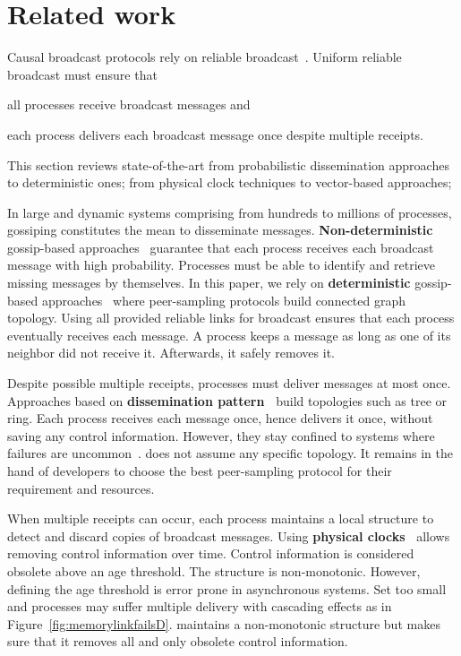 
\section{Related work}
\label{sec:relatedwork}

Causal broadcast protocols rely on reliable
broadcast~\cite{hadzilacos1994modular}. Uniform reliable broadcast must ensure
that
\begin{inparaenum}[(i)]
\item all processes receive broadcast messages and
\item each process delivers each broadcast message once despite multiple
  receipts.
\end{inparaenum} This section reviews state-of-the-art from probabilistic
dissemination approaches to deterministic ones; from physical clock techniques
to vector-based approaches;

In large and dynamic systems comprising from hundreds to millions of processes,
gossiping constitutes the mean to disseminate
messages. \textbf{Non-deterministic} gossip-based
approaches~\cite{birman1999bimodal,demers1987epidemic} guarantee that each
process receives each broadcast message with high probability. Processes must be
able to identify and retrieve missing messages by themselves. In this paper, we
rely on \textbf{deterministic} gossip-based
approaches~\cite{friedman2004causal,nedelec2017adaptive} where peer-sampling
protocols build connected graph topology. Using all provided reliable links for
broadcast ensures that each process eventually receives each message. A process
keeps a message as long as one of its neighbor did not receive it. Afterwards,
it safely removes it.

Despite possible multiple receipts, processes must deliver messages at most
once. Approaches based on \textbf{dissemination
  pattern~\cite{bravo2017saturn,raynal2013distributed}} build topologies such as
tree or ring. Each process receives each message once, hence delivers it once,
without saving any control information. However, they stay confined to systems
where failures are uncommon~\cite{krasikova2016hashtable}. \RPCBROADCAST does
not assume any specific topology. It remains in the hand of developers to choose
the best peer-sampling protocol for their requirement and resources.

When multiple receipts can occur, each process maintains a local structure to
detect and discard copies of broadcast messages. Using \textbf{physical
  clocks~\cite{cachin2011introduction,demers1987epidemic}} allows removing
control information over time. Control information is considered obsolete above
an age threshold. The structure is non-monotonic. However, defining the age
threshold is error prone in asynchronous systems. Set too small and processes
may suffer multiple delivery with cascading effects as in
Figure~\ref{fig:memorylinkfailsD}.  \RPCBROADCAST maintains a non-monotonic
structure but makes sure that it removes all and only obsolete control
information.

